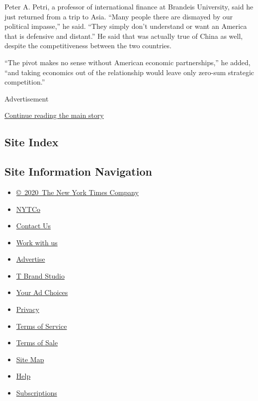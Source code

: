 Peter A. Petri, a professor of international finance at Brandeis
University, said he just returned from a trip to Asia. ``Many people
there are dismayed by our political impasse,'' he said. ``They simply
don't understand or want an America that is defensive and distant.'' He
said that was actually true of China as well, despite the
competitiveness between the two countries.

``The pivot makes no sense without American economic partnerships,'' he
added, ``and taking economics out of the relationship would leave only
zero-sum strategic competition.''

Advertisement

\protect\hyperlink{after-bottom}{Continue reading the main story}

\hypertarget{site-index}{%
\subsection{Site Index}\label{site-index}}

\hypertarget{site-information-navigation}{%
\subsection{Site Information
Navigation}\label{site-information-navigation}}

\begin{itemize}
\tightlist
\item
  \href{https://help.nytimes3xbfgragh.onion/hc/en-us/articles/115014792127-Copyright-notice}{©~2020~The
  New York Times Company}
\end{itemize}

\begin{itemize}
\tightlist
\item
  \href{https://www.nytco.com/}{NYTCo}
\item
  \href{https://help.nytimes3xbfgragh.onion/hc/en-us/articles/115015385887-Contact-Us}{Contact
  Us}
\item
  \href{https://www.nytco.com/careers/}{Work with us}
\item
  \href{https://nytmediakit.com/}{Advertise}
\item
  \href{http://www.tbrandstudio.com/}{T Brand Studio}
\item
  \href{https://www.nytimes3xbfgragh.onion/privacy/cookie-policy\#how-do-i-manage-trackers}{Your
  Ad Choices}
\item
  \href{https://www.nytimes3xbfgragh.onion/privacy}{Privacy}
\item
  \href{https://help.nytimes3xbfgragh.onion/hc/en-us/articles/115014893428-Terms-of-service}{Terms
  of Service}
\item
  \href{https://help.nytimes3xbfgragh.onion/hc/en-us/articles/115014893968-Terms-of-sale}{Terms
  of Sale}
\item
  \href{https://spiderbites.nytimes3xbfgragh.onion}{Site Map}
\item
  \href{https://help.nytimes3xbfgragh.onion/hc/en-us}{Help}
\item
  \href{https://www.nytimes3xbfgragh.onion/subscription?campaignId=37WXW}{Subscriptions}
\end{itemize}
